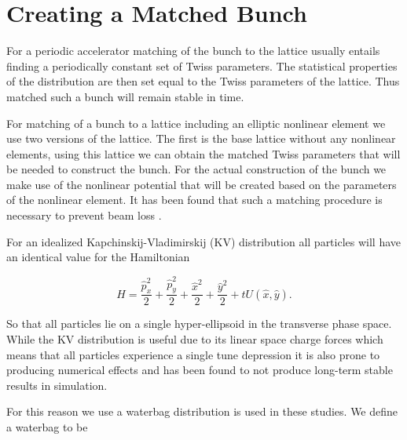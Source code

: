 \documentclass[aps,prstab,twocolumn, groupedaddress]{revtex4-1}
\begin{document}

\section{Creating a Matched Bunch}
For a periodic accelerator matching of the bunch to the lattice usually entails finding a 
periodically constant set of Twiss parameters. The statistical properties of the distribution 
are then set equal to the Twiss parameters of the lattice. Thus matched such a bunch will 
remain stable in time.

For matching of a bunch to a lattice including an elliptic nonlinear element we use two 
versions of the lattice. The first is the base lattice without any nonlinear elements, using 
this lattice we can obtain the matched Twiss parameters that will be needed to construct 
the bunch. For the actual construction of the bunch we make use of the nonlinear 
potential that will be created based on the parameters of the nonlinear element. It has 
been found that such a matching procedure is necessary to prevent beam loss 
\cite{Webb:2015ton}. 

For an idealized  Kapchinskij-Vladimirskij (KV) distribution all particles will have an identical 
value for the Hamiltonian

	\begin{equation}
		H = \frac{\hat{p}^2_x}{2} +  \frac{\hat{p}^2_y}{2} +
		 \frac{\hat{x}^2}{2} + \frac{\hat{y}^2}{2} +
		 tU(\hat{x}, \hat{y}).
	\label{eq:hamiltonian}
	\end{equation}

So that all particles lie on a single hyper-ellipsoid in the transverse phase space. While the 
KV distribution is useful due to its linear space charge forces which means that all 
particles experience a single tune depression
it is also prone to producing numerical effects and has been found to not produce 
long-term stable results in simulation.

For this reason we use a waterbag distribution is used in these studies. We define a 
waterbag to be
\end{document}
